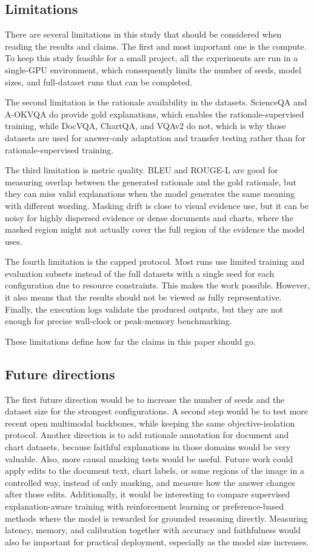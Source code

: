 \documentclass[preprint,12pt]{elsarticle}
\begin{document}
\subsection{Limitations}
There are several limitations in this study that should be considered when reading the results and claims.
The first and most important one is the compute.
To keep this study feasible for a small project, all the experiments are run in a single-GPU environment, which consequently limits the number of seeds, model sizes, and full-dataset runs that can be completed.

The second limitation is the rationale availability in the datasets.
ScienceQA and A-OKVQA do provide gold explanations, which enables the rationale-supervised training, while DocVQA, ChartQA, and VQAv2 do not, which is why those datasets are used for answer-only adaptation and transfer testing rather than for rationale-supervised training.

The third limitation is metric quality.
BLEU and ROUGE-L are good for measuring overlap between the generated rationale and the gold rationale, but they can miss valid explanations when the model generates the same meaning with different wording.
Masking drift is close to visual evidence use, but it can be noisy for highly dispersed evidence or dense documents and charts, where the masked region might not actually cover the full region of the evidence the model uses.

The fourth limitation is the capped protocol.
Most runs use limited training and evaluation subsets instead of the full datasets with a single seed for each configuration due to resource constraints.
This makes the work possible. However, it also means that the results should not be viewed as fully representative.
Finally, the execution logs validate the produced outputs, but they are not enough for precise wall-clock or peak-memory benchmarking.

These limitations define how far the claims in this paper should go.

\subsection{Future directions}
The first future direction would be to increase the number of seeds and the dataset size for the strongest configurations.
A second step would be to test more recent open multimodal backbones, while keeping the same objective-isolation protocol.
Another direction is to add rationale annotation for document and chart datasets, because faithful explanations in those domains would be very valuable.
Also, more causal masking tests would be useful.
Future work could apply edits to the document text, chart labels, or some regions of the image in a controlled way, instead of only masking, and measure how the answer changes after those edits.
Additionally, it would be interesting to compare supervised explanation-aware training with reinforcement learning or preference-based methods where the model is rewarded for grounded reasoning directly.
Measuring latency, memory, and calibration together with accuracy and faithfulness would also be important for practical deployment, especially as the model size increases.
\end{document}
